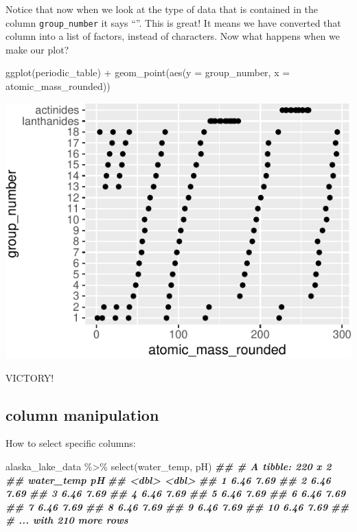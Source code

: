 \documentclass[
]{krantz}
\newenvironment{Shaded}{\begin{snugshade}}{\end{snugshade}}
\newcommand{\AttributeTok}[1]{\textcolor[rgb]{0.77,0.63,0.00}{#1}}
\newcommand{\DocumentationTok}[1]{\textcolor[rgb]{0.56,0.35,0.01}{\textbf{\textit{#1}}}}
\newcommand{\FunctionTok}[1]{\textcolor[rgb]{0.00,0.00,0.00}{#1}}
\newcommand{\NormalTok}[1]{#1}
\newcommand{\SpecialCharTok}[1]{\textcolor[rgb]{0.00,0.00,0.00}{#1}}
\begin{document}
Notice that now when we look at the type of data that is contained in the column \texttt{group\_number} it says ``''. This is great! It means we have converted that column into a list of factors, instead of characters. Now what happens when we make our plot?

\begin{Shaded}
\begin{Highlighting}[]
\FunctionTok{ggplot}\NormalTok{(periodic\_table) }\SpecialCharTok{+}
  \FunctionTok{geom\_point}\NormalTok{(}\FunctionTok{aes}\NormalTok{(}\AttributeTok{y =}\NormalTok{ group\_number, }\AttributeTok{x =}\NormalTok{ atomic\_mass\_rounded))}
\end{Highlighting}
\end{Shaded}

\begin{center}\includegraphics[width=0.8\linewidth]{index_files/figure-latex/unnamed-chunk-192-1} \end{center}

VICTORY!

\hypertarget{column-manipulation}{%
\subsection{column manipulation}\label{column-manipulation}}

How to select specific columns:

\begin{Shaded}
\begin{Highlighting}[]
\NormalTok{alaska\_lake\_data }\SpecialCharTok{\%\textgreater{}\%}
  \FunctionTok{select}\NormalTok{(water\_temp, pH)}
\DocumentationTok{\#\# \# A tibble: 220 x 2}
\DocumentationTok{\#\#    water\_temp    pH}
\DocumentationTok{\#\#         \textless{}dbl\textgreater{} \textless{}dbl\textgreater{}}
\DocumentationTok{\#\#  1       6.46  7.69}
\DocumentationTok{\#\#  2       6.46  7.69}
\DocumentationTok{\#\#  3       6.46  7.69}
\DocumentationTok{\#\#  4       6.46  7.69}
\DocumentationTok{\#\#  5       6.46  7.69}
\DocumentationTok{\#\#  6       6.46  7.69}
\DocumentationTok{\#\#  7       6.46  7.69}
\DocumentationTok{\#\#  8       6.46  7.69}
\DocumentationTok{\#\#  9       6.46  7.69}
\DocumentationTok{\#\# 10       6.46  7.69}
\DocumentationTok{\#\# \# ... with 210 more rows}
\end{Highlighting}
\end{Shaded}
\end{document}
